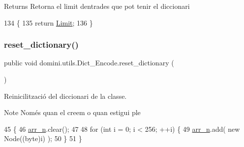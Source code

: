 \begin{DoxyReturn}{Returns}
Retorna el limit d\textquotesingle{}entrades que pot tenir el diccionari 
\end{DoxyReturn}

\begin{DoxyCode}
134                               \{
135         \textcolor{keywordflow}{return} \hyperlink{classdomini_1_1utils_1_1Dict__Encode_a48fe9a878056a119ad36a0aad2727a13}{Limit};
136     \}
\end{DoxyCode}
\mbox{\label{classdomini_1_1utils_1_1Dict__Encode_a6c3016286b3bb242d12799f8e7ebb585}} 
\subsubsection{\texorpdfstring{reset\+\_\+dictionary()}{reset\_dictionary()}}
{\footnotesize\ttfamily public void domini.\+utils.\+Dict\+\_\+\+Encode.\+reset\+\_\+dictionary (\begin{DoxyParamCaption}{ }\end{DoxyParamCaption})\hspace{0.3cm}{\ttfamily [inline]}}



Reinicilització del diccionari de la classe. 

\begin{DoxyNote}{Note}
Només quan el creem o quan estigui ple 
\end{DoxyNote}

\begin{DoxyCode}
45                                    \{
46         \hyperlink{classdomini_1_1utils_1_1Dict__Encode_abc506ae01222e16d9b6581efbdad1a97}{arr\_n}.clear();
47 
48         \textcolor{keywordflow}{for} (\textcolor{keywordtype}{int} i = 0; i < 256; ++i) \{
49             \hyperlink{classdomini_1_1utils_1_1Dict__Encode_abc506ae01222e16d9b6581efbdad1a97}{arr\_n}.add( \textcolor{keyword}{new} Node((byte)i) );
50         \}
51     \}
\end{DoxyCode}
\mbox{\label{classdomini_1_1utils_1_1Dict__Encode_a1bafdca1835da3fa93b900ff0aa720e0}} 
